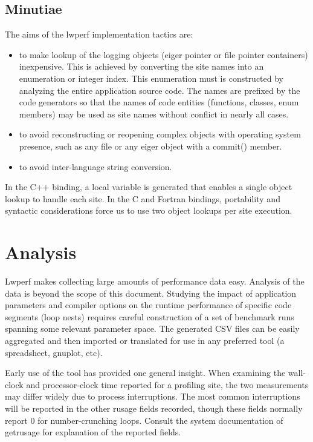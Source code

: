 \documentclass{article}
\begin{document}
\subsection{Minutiae}
The aims of the lwperf implementation tactics are:
\begin{itemize}
\item to make lookup of the logging objects (eiger pointer or file pointer containers) inexpensive. This is achieved by converting the site names into an enumeration or integer index. This enumeration must is constructed by analyzing the entire application source code. The names are prefixed by the code generators so that the names of code entities (functions, classes, enum members) may be used as site names without conflict in nearly all cases.

\item to avoid reconstructing or reopening complex objects with operating system presence, such as any file or any eiger object with a commit() member.
\item to avoid inter-language string conversion.
\end{itemize}

In the C++ binding, a local variable is generated that enables a single object lookup to handle each site. In the C and Fortran bindings, portability and syntactic considerations force us to use two object lookups per site execution.

\section{Analysis}
Lwperf makes collecting large amounts of performance data easy. Analysis of the data is beyond the scope of this document. Studying the impact of application parameters and compiler options on the runtime performance of specific code segments (loop nests) requires careful construction of a set of benchmark runs spanning some relevant parameter space. The generated CSV files can be easily aggregated and then imported or translated for use in any preferred tool (a spreadsheet, gnuplot, etc).

Early use of the tool has provided one general insight. When examining the wall-clock and processor-clock time reported for a profiling site, the two measurements may differ widely due to process interruptions. The most common interruptions will be reported in the other rusage fields recorded, though these fields normally report 0 for number-crunching loops. Consult the system documentation of getrusage for explanation of the reported fields.
\end{document}
